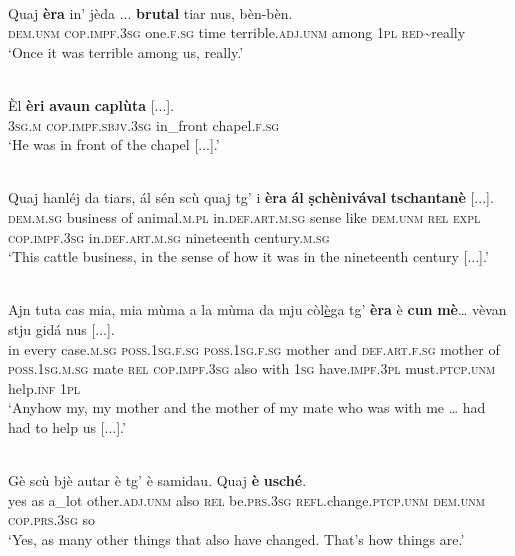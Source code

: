 \ea
\label{ex:cop:2}
\\
\gll Quaj \textbf{èra} in’ jèda ... \textbf{brutal} tiar nus, bèn-bèn.\\
\textsc{dem.unm} \textsc{cop.impf.3sg} one.\textsc{f.sg} time {} terrible.\textsc{adj.unm} among \textsc{1pl} \textsc{red}\textasciitilde{really}\\
\glt `Once it was terrible among us, really.'
\z

\ea
\label{ex:cop:3}
\\
\gll  Èl \textbf{èri} \textbf{avaun} \textbf{caplùta} [...].\\
\textsc{3sg.m} \textsc{cop.impf.sbjv.3sg} in\_front chapel.\textsc{f.sg}\\
\glt `He was in front of the chapel [...].'
\z

\ea
\label{ex:cop:4}
\\
\gll Quaj hanléj da tiars, ál sén scù quaj tg' i \textbf{èra} \textbf{ál} \textbf{ṣchènivával} \textbf{tschantanè} [...].\\
	\textsc{dem.m.sg} business of animal.\textsc{m.pl} in.\textsc{def.art.m.sg} sense like \textsc{dem.unm} \textsc{rel} \textsc{expl} \textsc{cop.impf.3sg} in.\textsc{def.art.m.sg} nineteenth century.\textsc{m.sg}\\
\glt`This cattle business, in the sense of how it was in the nineteenth century [...].'
\z

\ea
\label{ex:cop:6}
\\
\gll    Ajn tuta cas mia, mia mùma a la mùma da mju còl\underline{è}ga tg’ \textbf{èra} è \textbf{cun} \textbf{mè}… vèvan stju gidá nus [...].\\
in every case.\textsc{m.sg} \textsc{poss.1sg.f.sg}  \textsc{poss.1sg.f.sg} mother and \textsc{def.art.f.sg} mother of  \textsc{poss.1sg.m.sg} mate \textsc{rel}  \textsc{cop.impf.3sg} also with \textsc{1sg}  have.\textsc{impf.3pl} must.\textsc{ptcp.unm} help.\textsc{inf} \textsc{1pl}\\
\glt `Anyhow my, my mother and the mother of my mate who was with me … had had to help us [...].'
\z

\ea
\label{ex:cop:5}
\\
\gll    Gè scù bjè autar è tg’ è samidau. Quaj \textbf{è} \textbf{usché}.\\
yes as a\_lot other.\textsc{adj.unm} also \textsc{rel} be.\textsc{prs.3sg} \textsc{refl.}change.\textsc{ptcp.unm}  \textsc{dem.unm} \textsc{cop.prs.3sg} so\\
\glt `Yes, as many other things that also have changed. That’s how things are.'
\z

